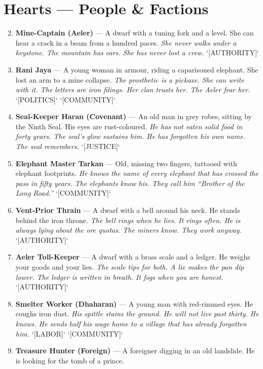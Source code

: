 \section*{Hearts --- People \& Factions}
\label{sec:himadri-people}
\begin{enumerate}
\setcounter{enumi}{1}
\item \textbf{Mine-Captain (Aeler)} --- A dwarf with a tuning fork and a level. She can hear a crack in a beam from a hundred paces.
  \hfill \textit{She never walks under a keystone. The mountain has ears. She has never lost a crew.} `[AUTHORITY]`
\item \textbf{Rani Jaya} --- A young woman in armour, riding a caparisoned elephant. She lost an arm to a mine collapse.
  \hfill \textit{The prosthetic is a pickaxe. She can write with it. The letters are iron filings. Her clan trusts her. The Aeler fear her.} `[POLITICS]` `[COMMUNITY]`
\item \textbf{Seal-Keeper Haran (Covenant)} --- An old man in grey robes, sitting by the Ninth Seal. His eyes are rust-coloured.
  \hfill \textit{He has not eaten solid food in forty years. The seal's glow sustains him. He has forgotten his own name. The seal remembers.} `[JUSTICE]`
\item \textbf{Elephant Master Tarkan} --- Old, missing two fingers, tattooed with elephant footprints.
  \hfill \textit{He knows the name of every elephant that has crossed the pass in fifty years. The elephants know his. They call him ``Brother of the Long Road.''} `[COMMUNITY]`
\item \textbf{Vent-Prior Thrain} --- A dwarf with a bell around his neck. He stands behind the iron throne.
  \hfill \textit{The bell rings when he lies. It rings often. He is always lying about the ore quotas. The miners know. They work anyway.} `[AUTHORITY]`
\item \textbf{Aeler Toll-Keeper} --- A dwarf with a brass scale and a ledger. He weighs your goods and your lies.
  \hfill \textit{The scale tips for both. A lie makes the pan dip lower. The ledger is written in breath. It fogs when you are honest.} `[AUTHORITY]`
\item \textbf{Smelter Worker (Dhaharan)} --- A young man with red-rimmed eyes. He coughs iron dust.
  \hfill \textit{His spittle stains the ground. He will not live past thirty. He knows. He sends half his wage home to a village that has already forgotten him.} `[LABOR]` `[COMMUNITY]`
\item \textbf{Treasure Hunter (Foreign)} --- A foreigner digging in an old landslide. He is looking for the tomb of a prince.

\end{enumerate}
